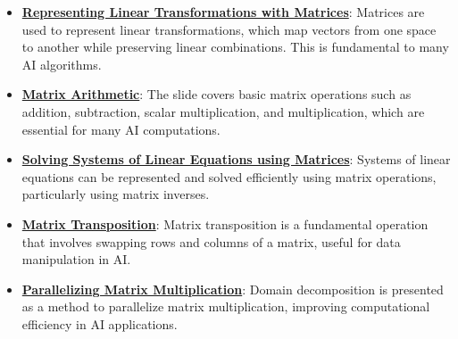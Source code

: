 \documentclass{article}%
\begin{document}
\begin{itemize}[leftmargin=*]%
\item \href{\url{https://purdue.brightspace.com/d2l/common/assets/pdfjs-d2l-dist/1.0.14-legacy/web/viewer.html?file=\%252Fcontent\%252Fenforced\%252F1095467-wl.202510.CS.24300.001\%252F04L1-Linear\%20Algebra\%20Primer.pdf\%253Fou\%253D1095467\&lang=en-us\&container=d2l-fileviewer-rendered-pdf\&fullscreen=d2l-fileviewer-rendered-pdf-dialog\&height=667}#page=5}{\textbf{Representing Linear Transformations with Matrices}}: Matrices are used to represent linear transformations, which map vectors from one space to another while preserving linear combinations. This is fundamental to many AI algorithms.%
\item \href{\url{https://purdue.brightspace.com/d2l/common/assets/pdfjs-d2l-dist/1.0.14-legacy/web/viewer.html?file=\%252Fcontent\%252Fenforced\%252F1095467-wl.202510.CS.24300.001\%252F04L1-Linear\%20Algebra\%20Primer.pdf\%253Fou\%253D1095467\&lang=en-us\&container=d2l-fileviewer-rendered-pdf\&fullscreen=d2l-fileviewer-rendered-pdf-dialog\&height=667}#page=9}{\textbf{Matrix Arithmetic}}: The slide covers basic matrix operations such as addition, subtraction, scalar multiplication, and multiplication, which are essential for many AI computations.%
\item \href{\url{https://purdue.brightspace.com/d2l/common/assets/pdfjs-d2l-dist/1.0.14-legacy/web/viewer.html?file=\%252Fcontent\%252Fenforced\%252F1095467-wl.202510.CS.24300.001\%252F04L1-Linear\%20Algebra\%20Primer.pdf\%253Fou\%253D1095467\&lang=en-us\&container=d2l-fileviewer-rendered-pdf\&fullscreen=d2l-fileviewer-rendered-pdf-dialog\&height=667}#page=11}{\textbf{Solving Systems of Linear Equations using Matrices}}: Systems of linear equations can be represented and solved efficiently using matrix operations, particularly using matrix inverses.%
\item \href{\url{https://purdue.brightspace.com/d2l/common/assets/pdfjs-d2l-dist/1.0.14-legacy/web/viewer.html?file=\%252Fcontent\%252Fenforced\%252F1095467-wl.202510.CS.24300.001\%252F04L1-Linear\%20Algebra\%20Primer.pdf\%253Fou\%253D1095467\&lang=en-us\&container=d2l-fileviewer-rendered-pdf\&fullscreen=d2l-fileviewer-rendered-pdf-dialog\&height=667}#page=16}{\textbf{Matrix Transposition}}: Matrix transposition is a fundamental operation that involves swapping rows and columns of a matrix, useful for data manipulation in AI.%
\item \href{\url{https://purdue.brightspace.com/d2l/common/assets/pdfjs-d2l-dist/1.0.14-legacy/web/viewer.html?file=\%252Fcontent\%252Fenforced\%252F1095467-wl.202510.CS.24300.001\%252F04L1-Linear\%20Algebra\%20Primer.pdf\%253Fou\%253D1095467\&lang=en-us\&container=d2l-fileviewer-rendered-pdf\&fullscreen=d2l-fileviewer-rendered-pdf-dialog\&height=667}#page=18}{\textbf{Parallelizing Matrix Multiplication}}: Domain decomposition is presented as a method to parallelize matrix multiplication, improving computational efficiency in AI applications.%

\end{itemize}
\end{document}
